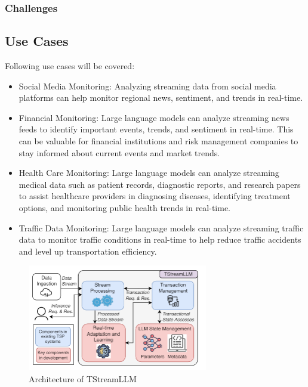 \documentclass[runningheads]{llncs}
\begin{document}
\subsubsection{Challenges}

\subsection{Use Cases}
Following use cases will be covered:
\begin{itemize}
    \item Social Media Monitoring: Analyzing streaming data from social media platforms can help monitor regional news, sentiment, and trends in real-time.
    \item Financial Monitoring:  Large language models can analyze streaming news feeds to identify important events, trends, and sentiment in real-time. This can be valuable for financial institutions and risk management companies to stay informed about current events and market trends.
    \item Health Care Monitoring: Large language models can analyze streaming medical data such as patient records, diagnostic reports, and research papers to assist healthcare providers in diagnosing diseases, identifying treatment options, and monitoring public health trends in real-time.
    \item Traffic Data Monitoring: Large language models can analyze streaming traffic data to monitor traffic conditions in real-time to help reduce traffic accidents and level up transportation efficiency. 
\end{itemize}
\begin{figure}[]
  \centering
  \includegraphics[width=0.7\textwidth]{TStreamLLM architecture.png}
  \caption{Architecture of TStreamLLM \cite{Zhang24}}
  \label{fig:TStreamLLM}
\end{figure}
\end{document}
